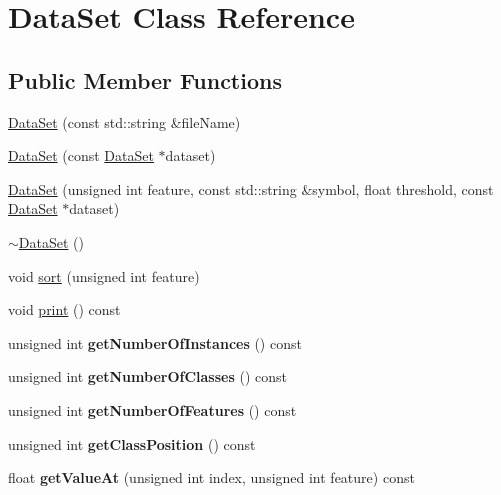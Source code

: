 \hypertarget{class_data_set}{}\section{Data\+Set Class Reference}
\label{class_data_set}
\subsection*{Public Member Functions}
\begin{DoxyCompactItemize}
\item 
\hyperlink{class_data_set_af53be1e951d7c1b632e8349ad76dcb61}{Data\+Set} (const std\+::string \&file\+Name)
\item 
\hyperlink{class_data_set_a0e2a07da891a7718504a527941f65d6b}{Data\+Set} (const \hyperlink{class_data_set}{Data\+Set} $\ast$dataset)
\item 
\hyperlink{class_data_set_a0e8cc0181dc015bcc19f27b71546b000}{Data\+Set} (unsigned int feature, const std\+::string \&symbol, float threshold, const \hyperlink{class_data_set}{Data\+Set} $\ast$dataset)
\item 
\hyperlink{class_data_set_a2cdb84d32331956b413ca36933e516bd}{$\sim$\+Data\+Set} ()
\item 
void \hyperlink{class_data_set_a0612aa4b99b6fa3dcfcd89eb34c13074}{sort} (unsigned int feature)
\item 
void \hyperlink{class_data_set_a09a5b0317e5afc196c9ba51d16f3752c}{print} () const 
\item 
\hypertarget{class_data_set_a85000fd7a1c42ae40c4144fab690dd3d}{}unsigned int {\bfseries get\+Number\+Of\+Instances} () const \label{class_data_set_a85000fd7a1c42ae40c4144fab690dd3d}

\item 
\hypertarget{class_data_set_aa1bc762bba62e8809d1ce606d06bc4aa}{}unsigned int {\bfseries get\+Number\+Of\+Classes} () const \label{class_data_set_aa1bc762bba62e8809d1ce606d06bc4aa}

\item 
\hypertarget{class_data_set_aa374c29cf0015f172e1c87026885828f}{}unsigned int {\bfseries get\+Number\+Of\+Features} () const \label{class_data_set_aa374c29cf0015f172e1c87026885828f}

\item 
\hypertarget{class_data_set_af995f0a16c41de155d836bec26651f6f}{}unsigned int {\bfseries get\+Class\+Position} () const \label{class_data_set_af995f0a16c41de155d836bec26651f6f}

\item 
\hypertarget{class_data_set_a4023d83ecf962c6363ee60f78c979b33}{}float {\bfseries get\+Value\+At} (unsigned int index, unsigned int feature) const \label{class_data_set_a4023d83ecf962c6363ee60f78c979b33}


\end{DoxyCompactItemize}
